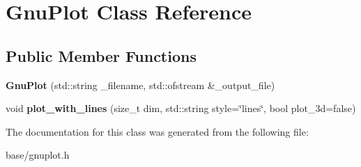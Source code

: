\hypertarget{classGnuPlot}{}\section{Gnu\+Plot Class Reference}
\label{classGnuPlot}
\subsection*{Public Member Functions}
\begin{DoxyCompactItemize}
\item 
\mbox{\label{classGnuPlot_ab76925e10c41c54c30e9d96553febdda}} 
{\bfseries Gnu\+Plot} (std\+::string \+\_\+filename, std\+::ofstream \&\+\_\+output\+\_\+file)
\item 
\mbox{\label{classGnuPlot_aea47640d0d3b69e2325489e62ca203fd}} 
void {\bfseries plot\+\_\+with\+\_\+lines} (size\+\_\+t dim, std\+::string style=\char`\"{}lines\char`\"{}, bool plot\+\_\+3d=false)
\end{DoxyCompactItemize}


The documentation for this class was generated from the following file\+:\begin{DoxyCompactItemize}
\item 
base/gnuplot.\+h\end{DoxyCompactItemize}
